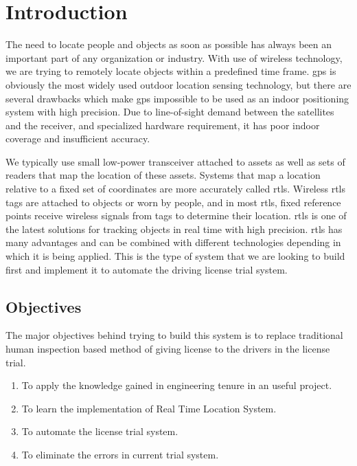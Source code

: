 \section{Introduction}
The need to locate people and objects as soon as possible has always been an important part of any organization or industry. With use of wireless technology, we are trying to remotely locate objects within a predefined time frame. \gls{gps} is obviously the most widely used outdoor location sensing technology, but there are several drawbacks which make \gls{gps} impossible to be used as an indoor positioning system with high precision. Due to line-of-sight demand between the satellites and the receiver, and specialized hardware requirement, it has poor indoor coverage and insufficient accuracy\cite{Insufficient}. 

We typically use small low-power transceiver attached to assets as well as sets of readers that map the location of these assets. Systems that map a location relative to a fixed set of coordinates are more accurately called \gls{rtls}. Wireless \gls{rtls} tags are attached to objects or worn by people, and in most \gls{rtls}, fixed reference points receive wireless signals from tags to determine their location. \gls{rtls} is one of the latest solutions for tracking objects in real time with high precision. \gls{rtls} has many advantages and can be combined with different technologies depending in which it is being applied. This is the type of system that we are looking to build first and implement it to automate the driving license trial system.


\subsection{Objectives}
The major objectives behind trying to build this system is to replace traditional human inspection based method of giving license to the drivers in the license trial.  
\begin{enumerate}
\item To apply the knowledge gained in engineering tenure in an useful project.
\item To learn the implementation of Real Time Location System.
\item To automate the license trial system.
\item To eliminate the errors in current trial system.

\end{enumerate}


